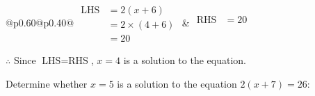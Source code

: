 \documentclass[12pt]{article}
\newcounter{minipagecount}
\begin{document}
\begin{multicols}{2}
\begin{minipage}[t]{0.40\textwidth}
    \renewcommand{\arraystretch}{1.3} %
    \begin{tabular}{@{}p{0.60\linewidth}@{}p{0.40\linewidth}@{}}
        \(\begin{aligned}
            \text{LHS} &= 2(x + 6) \\
                    &= 2 \times(4 + 6) \\
                    &= 20
        \end{aligned}\) &
        \(\begin{aligned}
            \text{RHS} &= 20\\
                    & \\
                    &
        \end{aligned}\)
    \end{tabular}
    \renewcommand{\arraystretch}{1.0} %
    \vspace{2pt}  %

    \noindent \(\therefore\) Since \(\text{LHS} = \text{RHS}\), \(x = 4\) is  a solution to the equation.

\end{minipage}

 \vspace*{16pt}
\noindent{(\theminipagecount)}\hspace{0.1mm} %
\begin{minipage}[t]{0.40\textwidth} %

    \noindent Determine whether \(x = 5\) is a solution to the equation \(2(x + 7) = 26\):
    \vspace{4pt}  %

    \noindent


\end{minipage}
\end{multicols}
\end{document}
